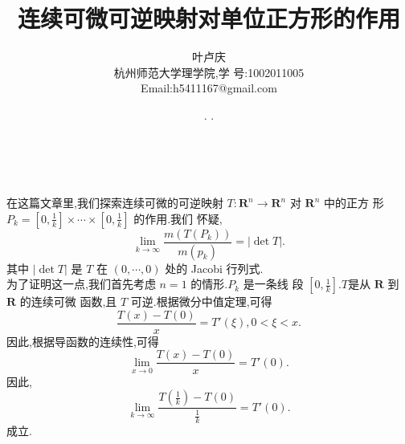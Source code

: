 \message{ !name(连续可微可逆映射对单位正方形的作用.tex)}\documentclass[a4paper, 12pt]{article} %
\makeatletter
\renewcommand{\maketitle}{ %
  \renewcommand\refname{参考文献}
  \newcommand{\D}{\displaystyle}\newcommand{\ri}{\Rightarrow}
  \newcommand{\ds}{\displaystyle} \renewcommand{\ni}{\noindent}
  \newcommand{\pa}{\partial} \newcommand{\Om}{\Omega}
  \newcommand{\om}{\omega} \newcommand{\sik}{\sum_{i=1}^k}
  \newcommand{\vov}{\Vert\omega\Vert} \newcommand{\Umy}{U_{\mu_i,y^i}}
  \newcommand{\lamns}{\lambda_n^{^{\scriptstyle\sigma}}}
  \newcommand{\chiomn}{\chi_{_{\Omega_n}}}
  \newcommand{\ullim}{\underline{\lim}} \newcommand{\bsy}{\boldsymbol}
  \newcommand{\mvb}{\mathversion{bold}} \newcommand{\la}{\lambda}
  \newcommand{\La}{\Lambda} \newcommand{\va}{\varepsilon}
  \newcommand{\be}{\beta} \newcommand{\al}{\alpha}
  \newcommand{\dis}{\displaystyle} \newcommand{\R}{{\mathbb R}}
  \newcommand{\N}{{\mathbb N}} \newcommand{\cF}{{\mathcal F}}
  \newcommand{\gB}{{\mathfrak B}} \newcommand{\eps}{\epsilon}
  \begin{flushright} %
    {\LARGE\@title} %
    
    \vspace{50pt} %
    
    {\large\@author} %
    \\\@date %
    
    \vspace{40pt} %
  \end{flushright}
}
\makeatother
\begin{document}

\title{\textbf{连续可微可逆映射对单位正方形的作用}}
\author{\small{叶卢庆}\\{\small{杭州师范大学理学院,学
      号:1002011005}}\\{\small{Email:h5411167@gmail.com}}} %
\renewcommand{\today}{\number\year. \number\month. \number\day}
\date{\today} %
  
  
  
\maketitle %
  
  
  
  
  
  
  
在这篇文章里,我们探索连续可微的可逆映射 $T:\mathbf{R}^n\to
\mathbf{R}^n$ 对 $\mathbf{R}^n$ 中的正方
形$P_{k}=[0,\frac{1}{k}]\times\cdots\times [0,\frac{1}{k}]$ 的作用.我们
怀疑,
$$
\lim_{k\to \infty}\frac{m(T(P_k))}{m(p_k)}=|\det T|.
$$
其中 $|\det T|$ 是 $T$ 在 $(0,\cdots,0)$ 处的 Jacobi 行列式.\\

为了证明这一点,我们首先考虑 $n=1$ 的情形.$P_k$ 是一条线
段 $[0,\frac{1}{k}]$.$T$是从 $\mathbf{R}$ 到 $\mathbf{R}$ 的连续可微
函数,且 $T$ 可逆.根据微分中值定理,可得
$$
\frac{T(x)-T(0)}{x}=T'(\xi),0<\xi<x.
$$
因此,根据导函数的连续性,可得
$$
\lim_{x\to 0} \frac{T(x)-T(0)}{x}=T'(0).
$$
因此,
$$
\lim_{k\to\infty}\frac{T(\frac{1}{k})-T(0)}{\frac{1}{k}}=T'(0).
$$
成立.\\
\end{document}
